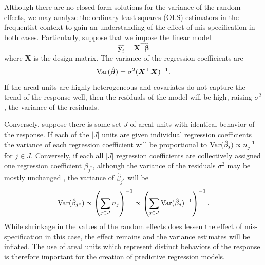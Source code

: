 \documentclass[twoside,12pt,bibstyle=chem-acs]{reedthesis}
\begin{document}
Although there are no closed form solutions for the variance of the random effects, we may analyze the ordinary least squares (OLS) estimators in the frequentist context to gain an understanding of the effect of mis-specification in both cases. Particularly, suppose that we impose the linear model
\begin{equation*}
\hat{\bm{y}_i} = \bm{X}^\top\hat{\bm\beta}%
\end{equation*}
where $\bm{X}$ is the design matrix. The variance of the regression coefficients are
 \cite{keener_theoretical_2010}
\begin{equation*}
\var(\hat{\bm\beta}) = \sigma^2(\bm{X}^\top \bm{X})^{-1}. %
\end{equation*}
If the areal units are highly heterogeneous and covariates do not capture the trend of the response well, then the residuals of the model will be high, raising ${\sigma}^2$, the variance of the residuals.

Conversely, suppose there is some set $J$ of areal units with identical behavior of the response. 
If each of the $|J|$ units are given individual regression coefficients the variance of each regression coefficient will be proportional to $\mathrm{Var}(\hat{\beta}_{j}) \propto n_j^{-1}$ for $j \in J$. Conversely, if each all $|J|$ regression coefficients are collectively assigned one regression coefficient $\beta_{j^*}$, although the variance of the residuals ${\sigma}^2$ may be mostly unchanged%
, the variance of $\hat{\beta}_{j^*}$ will be
\begin{equation*}
\mathrm{Var}(\hat{\beta}_{j^*}) \propto \left(\sum_{j \in J}n_j\right)^{-1} \propto \left(\sum_{j \in J}\mathrm{Var}(\hat{\beta}_j)^{-1}\right)^{-1}.
\end{equation*}
While shrinkage in the values of the random effects does lessen the effect of mis-specification in this case, the effect remains and the variance estimates will be inflated. 
The use of areal units which represent distinct behaviors of the response is therefore important for the creation of predictive regression models. 
\end{document}
